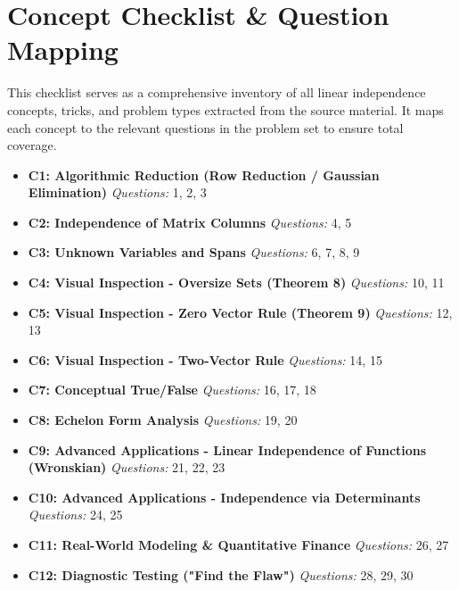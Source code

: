 \documentclass[12pt]{article}
\begin{document}
\newpage
\section{Concept Checklist \& Question Mapping}
This checklist serves as a comprehensive inventory of all linear independence concepts, tricks, and problem types extracted from the source material. It maps each concept to the relevant questions in the problem set to ensure total coverage.

\begin{itemize}
    \item \textbf{C1: Algorithmic Reduction (Row Reduction / Gaussian Elimination)} 
    \newline \textit{Questions:} 1, 2, 3
    
    \item \textbf{C2: Independence of Matrix Columns}
    \newline \textit{Questions:} 4, 5
    
    \item \textbf{C3: Unknown Variables and Spans}
    \newline \textit{Questions:} 6, 7, 8, 9
    
    \item \textbf{C4: Visual Inspection - Oversize Sets (Theorem 8)}
    \newline \textit{Questions:} 10, 11
    
    \item \textbf{C5: Visual Inspection - Zero Vector Rule (Theorem 9)}
    \newline \textit{Questions:} 12, 13
    
    \item \textbf{C6: Visual Inspection - Two-Vector Rule}
    \newline \textit{Questions:} 14, 15
    
    \item \textbf{C7: Conceptual True/False}
    \newline \textit{Questions:} 16, 17, 18
    
    \item \textbf{C8: Echelon Form Analysis}
    \newline \textit{Questions:} 19, 20
    
    \item \textbf{C9: Advanced Applications - Linear Independence of Functions (Wronskian)}
    \newline \textit{Questions:} 21, 22, 23
    
    \item \textbf{C10: Advanced Applications - Independence via Determinants}
    \newline \textit{Questions:} 24, 25
    
    \item \textbf{C11: Real-World Modeling \& Quantitative Finance}
    \newline \textit{Questions:} 26, 27
    
    \item \textbf{C12: Diagnostic Testing ("Find the Flaw")}
    \newline \textit{Questions:} 28, 29, 30
\end{itemize}
\end{document}
